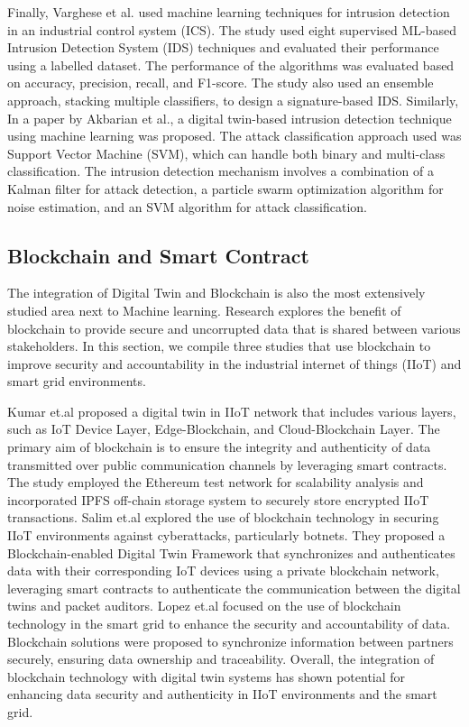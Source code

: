 Finally, Varghese et al.\cite{vargheseDigitalTwinbasedIntrusion2022} used machine learning techniques for intrusion detection in an industrial control system (ICS). The study used eight supervised ML-based Intrusion Detection System (IDS) techniques and evaluated their performance using a labelled dataset. The performance of the algorithms was evaluated based on accuracy, precision, recall, and F1-score. The study also used an ensemble approach, stacking multiple classifiers, to design a signature-based IDS. Similarly, In a paper by Akbarian et al.\cite{akbarianIntrusionDetectionDigital2020}, a digital twin-based intrusion detection technique using machine learning was proposed. The attack classification approach used was Support Vector Machine (SVM), which can handle both binary and multi-class classification. The intrusion detection mechanism involves a combination of a Kalman filter for attack detection, a particle swarm optimization algorithm for noise estimation, and an SVM algorithm for attack classification.


 

\subsection{Blockchain and Smart Contract}
The integration of Digital Twin and Blockchain is also the most extensively studied area next to Machine learning. Research explores the benefit of blockchain to provide secure and uncorrupted data that is shared between various stakeholders. In this section, we compile three studies that use blockchain to improve security and accountability in the industrial internet of things (IIoT) and smart grid environments.  


 Kumar et.al\cite{kumarBlockchainDeepLearning2022} proposed a digital twin in IIoT network that includes various layers, such as IoT Device Layer, Edge-Blockchain, and Cloud-Blockchain Layer. The primary aim of blockchain is to ensure the integrity and authenticity of data transmitted over public communication channels by leveraging smart contracts. The study employed the Ethereum test network for scalability analysis and incorporated IPFS off-chain storage system to securely store encrypted IIoT transactions. Salim et.al\cite{salimBlockchainEnabledSecureDigital2022} explored the use of blockchain technology in securing IIoT environments against cyberattacks, particularly botnets. They proposed a Blockchain-enabled Digital Twin Framework that synchronizes and authenticates data with their corresponding IoT devices using a private blockchain network, leveraging smart contracts to authenticate the communication between the digital twins and packet auditors. Lopez et.al\cite{lopezDIGITALTWINSINTELLIGENT2021} focused on the use of blockchain technology in the smart grid to enhance the security and accountability of data. Blockchain solutions were proposed to synchronize information between partners securely, ensuring data ownership and traceability. Overall, the integration of blockchain technology with digital twin systems has shown potential for enhancing data security and authenticity in IIoT environments and the smart grid.


